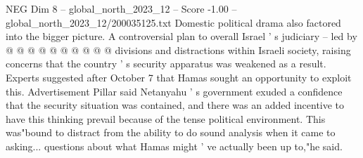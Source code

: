 \begin{textsample}{NEG Dim 8 – global\_north\_2023\_12 – Score -1.00 – global\_north\_2023\_12/200035125.txt}
Domestic political drama also factored into the bigger picture.
A controversial plan to overall Israel ' s judiciary -- led by @ @ @ @ @ @ @ @ @ @ divisions and distractions within Israeli society, raising concerns that the country ' s security apparatus was weakened as a result.
Experts suggested after October 7 that Hamas sought an opportunity to exploit this.
Advertisement Pillar said Netanyahu ' s government exuded a confidence that the security situation was contained, and there was an added incentive to have this thinking prevail because of the tense political environment.
This was"bound to distract from the ability to do sound analysis when it came to asking... questions about what Hamas might ' ve actually been up to,"he said.

\end{textsample}

